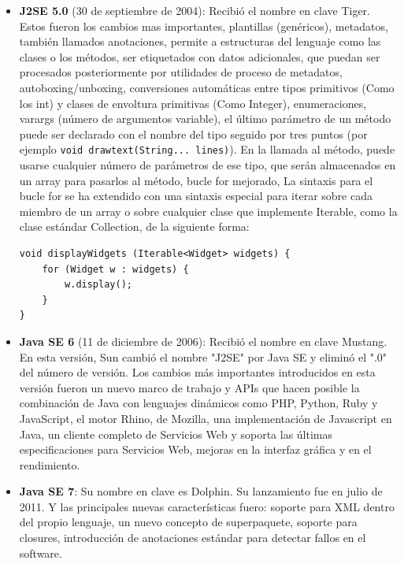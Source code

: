 \begin{itemize}
    \item \textbf{J2SE 5.0} (30 de septiembre de 2004): Recibió el nombre en clave Tiger. Estos fueron los cambios mas importantes, plantillas (genéricos), metadatos, también llamados anotaciones, permite a estructuras del lenguaje como las clases o los métodos, ser etiquetados con datos adicionales, que puedan ser procesados posteriormente por utilidades de proceso de metadatos, autoboxing/unboxing, conversiones automáticas entre tipos primitivos (Como los int) y clases de envoltura primitivas (Como Integer), enumeraciones, varargs (número de argumentos variable), el último parámetro de un método puede ser declarado con el nombre del tipo seguido por tres puntos (por ejemplo \lstinline{void drawtext(String... lines)}). En la llamada al método, puede usarse cualquier número de parámetros de ese tipo, que serán almacenados en un array para pasarlos al método, bucle for mejorado, La sintaxis para el bucle for se ha extendido con una sintaxis especial para iterar sobre cada miembro de un array o sobre cualquier clase que implemente Iterable, como la clase estándar Collection, de la siguiente forma:

\begin{lstlisting}[style=Java]
void displayWidgets (Iterable<Widget> widgets) {
	for (Widget w : widgets) {
		w.display();
	}
}
\end{lstlisting}

    \item \textbf{Java SE 6} (11 de diciembre de 2006): Recibió el nombre en clave Mustang. En esta versión, Sun cambió el nombre "J2SE" por Java SE y eliminó el ".0" del número de versión. Los cambios más importantes introducidos en esta versión fueron un nuevo marco de trabajo y APIs que hacen posible la combinación de Java con lenguajes dinámicos como PHP, Python, Ruby y JavaScript, el motor Rhino, de Mozilla, una implementación de Javascript en Java, un cliente completo de Servicios Web y soporta las últimas especificaciones para Servicios Web, mejoras en la interfaz gráfica y en el rendimiento.
    
    \item \textbf{Java SE 7}: Su nombre en clave es Dolphin. Su lanzamiento fue en julio de 2011. Y las principales nuevas características fuero: soporte para XML dentro del propio lenguaje, un nuevo concepto de superpaquete, soporte para closures, introducción de anotaciones estándar para detectar fallos en el software.

\end{itemize}

